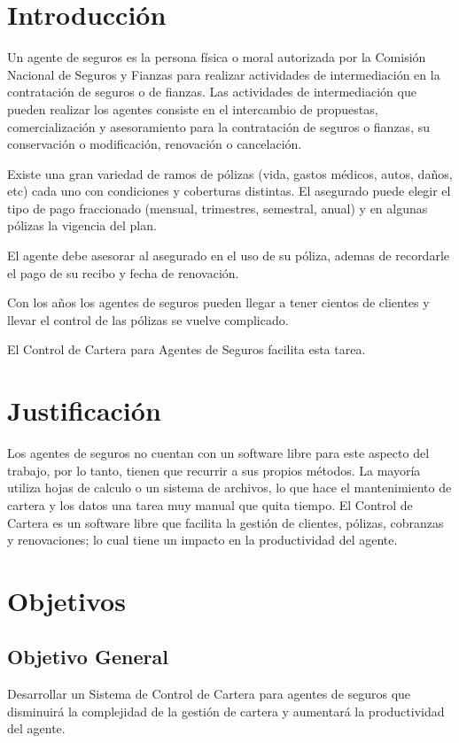 \setcounter{page}{1}
\tableofcontents

\section{Introducción}%
Un agente de seguros es la persona física o moral autorizada por la Comisión Nacional de Seguros y Fianzas para realizar actividades de intermediación en la contratación de seguros o de fianzas. Las actividades de intermediación que pueden realizar los agentes consiste en el intercambio de propuestas, comercialización y asesoramiento para la contratación de seguros o fianzas, su conservación o modificación, renovación o cancelación. \cite{www:reg-agentes}

Existe una gran variedad de ramos de pólizas (vida, gastos médicos, autos, daños, etc) cada uno con condiciones y coberturas distintas. El asegurado puede elegir el tipo de pago fraccionado (mensual, trimestres, semestral, anual) y en algunas pólizas la vigencia del plan.

El agente debe asesorar al asegurado en el uso de su póliza, ademas de recordarle el pago de su recibo y fecha de renovación.

Con los años los agentes de seguros pueden llegar a tener cientos de clientes y llevar el control de las pólizas se vuelve complicado.

El Control de Cartera para Agentes de Seguros facilita esta tarea.

\section{Justificación}

Los agentes de seguros no cuentan con un software libre para este aspecto del trabajo, por lo tanto, tienen que recurrir a sus propios métodos. La mayoría utiliza hojas de calculo o un sistema de archivos, lo que hace el mantenimiento de cartera y los datos una tarea muy manual que quita tiempo.
El Control de Cartera es un software libre que facilita la gestión de clientes, pólizas, cobranzas y renovaciones; lo cual tiene un impacto en la productividad del agente.

\section{Objetivos}
\subsection*{Objetivo General}
Desarrollar un Sistema de Control de Cartera para agentes de seguros que disminuirá la complejidad de la gestión de cartera y aumentará la productividad del agente.
